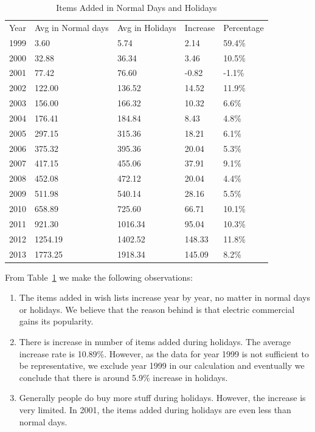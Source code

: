 \documentclass{llncs}
\begin{document}
\begin{table}[!htbp]
\centering
\caption{Items Added in Normal Days and Holidays}
\label{tb:year}
\begin{tabular}{lllll}
Year & Avg in Normal days & Avg in Holidays & Increase & Percentage \\
1999 & 3.60 & 5.74 & 2.14 & 59.4\% \\
2000 & 32.88 & 36.34 & 3.46 & 10.5\% \\
2001 & 77.42 & 76.60 & -0.82 & -1.1\% \\
2002 & 122.00 & 136.52 & 14.52 & 11.9\% \\
2003 & 156.00 & 166.32 & 10.32 & 6.6\% \\
2004 & 176.41 & 184.84 & 8.43 & 4.8\% \\
2005 & 297.15 & 315.36 & 18.21 & 6.1\% \\
2006 & 375.32 & 395.36 & 20.04 & 5.3\% \\
2007 & 417.15 & 455.06 & 37.91 & 9.1\% \\
2008 & 452.08 & 472.12 & 20.04 & 4.4\% \\
2009 & 511.98 & 540.14 & 28.16 & 5.5\% \\
2010 & 658.89 & 725.60 & 66.71 & 10.1\% \\
2011 & 921.30 & 1016.34 & 95.04 & 10.3\% \\
2012 & 1254.19 & 1402.52 & 148.33 & 11.8\% \\
2013 & 1773.25 & 1918.34 & 145.09 & 8.2\% \\
\end{tabular}
\end{table}

From Table~\ref{tb:year} we make the following observations:
\begin{enumerate}
\item The items added in wish lists increase year by year, no matter in normal days or holidays. We believe that the reason behind is that electric commercial gains its popularity.
\item There is increase in number of items added during holidays. The average increase rate is 10.89\%. However, as the data for year 1999 is not sufficient to be representative, we exclude year 1999 in our calculation and eventually we conclude that there is around 5.9\% increase in holidays. 
\item Generally people do buy more stuff during holidays. However, the increase is very limited. In 2001, the items added during holidays are even less than normal days. 
\end{enumerate}
\end{document}
